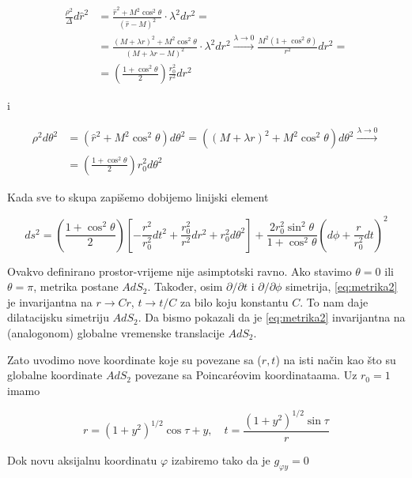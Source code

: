\begin{equation}
\begin{split}
\frac{\rho^2}{\Delta}d\hat{r}^2&=\frac{\hat{r}^2+M^2\cos^2\theta}{(\hat{r}-M)^2}\cdot \lambda^2dr^2=\\
&=\frac{(M+\lambda r)^2+M^2\cos^2\theta}{(M+\lambda r-M)^2}\cdot \lambda^2dr^2\xrightarrow{\lambda\to 0}\frac{M^2(1+\cos^2\theta)}{r^2}dr^2=\\
&=\left(\frac{1+\cos^2\theta}{2}\right)\frac{r_0^2}{r^2}dr^2
\end{split}
\end{equation}

\noindent i

\begin{equation}
\begin{split}
\rho^2d\theta^2&=(\hat{r}^2+M^2\cos^2\theta)d\theta^2=\left((M+\lambda r)^2+M^2\cos^2\theta\right)d\theta^2\xrightarrow{\lambda\to 0}\\
&=\left(\frac{1+\cos^2\theta}{2}\right)r_0^2d\theta^2
\end{split}
\end{equation}

\noindent Kada sve to skupa zapišemo dobijemo linijski element

\begin{equation}
ds^2=\left(\frac{1+\cos^2\theta}{2}\right)\left[-\frac{r^2}{r_0^2}dt^2+\frac{r_0^2}{r^2}dr^2+r_0^2d\theta^2\right]+\frac{2r_0^2\sin^2\theta}{1+\cos^2\theta}\left(d\phi+\frac{r}{r_0^2}dt\right)^2
\label{eq:metrika2}
\end{equation}

\noindent Ovakvo definirano prostor-vrijeme nije asimptotski ravno. Ako stavimo $\theta=0$ ili $\theta=\pi$, metrika postane $AdS_2$. Također, osim $\partial/\partial t$ i $\partial/\partial \phi$ simetrija, \eqref{eq:metrika2} je invarijantna na $r\to Cr$, $t\to t/C$ za bilo koju konstantu $C$. To nam daje dilatacijsku simetriju $AdS_2$. Da bismo pokazali da je \eqref{eq:metrika2} invarijantna na (analogonom) globalne vremenske translacije $AdS_2$.

\noindent Zato uvodimo nove koordinate koje su povezane sa ($r,t$) na isti način kao što su globalne koordinate $AdS_2$ povezane sa Poincar\'eovim koordinataama. Uz $r_0=1$ imamo

\begin{equation}
r=(1+y^2)^{1/2}\cos\tau+y,\quad t=\frac{(1+y^2)^{1/2}\sin\tau}{r}
\end{equation}

\noindent Dok novu aksijalnu koordinatu $\varphi$ izabiremo tako da je $g_{\varphi y}=0$

